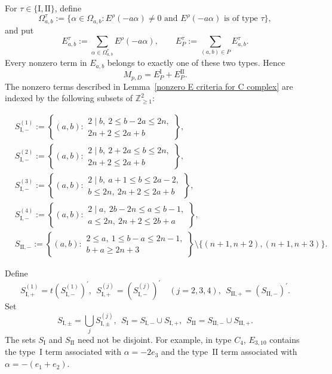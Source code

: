\documentclass[11pt,a4paper]{amsart}
\newcommand{\ZZ}{\mathbb Z}
\theoremstyle{plain}
\numberwithin{equation}{section}
\def\leq{\leqslant}
\def\geq{\geqslant}
\begin{document}
For \(\tau\in\{\mathrm{I},\mathrm{II}\}\), define
\[
\Omega_{a,b}^{\tau}
:=\{\alpha\in\Omega_{a,b}:
E^\rho(-a\alpha)\ne0
\text{ and }E^\rho(-a\alpha)\text{ is of type }\tau\},
\]
and put
\[
E_{a,b}^{\tau}
:=\sum_{\alpha\in\Omega_{a,b}^{\tau}}E^\rho(-a\alpha),
\qquad
E_P^{\tau}
:=\sum_{(a,b)\in P}E_{a,b}^{\tau}.
\]
Every nonzero term in \(E_{a,b}\) belongs to exactly one of these
two types. Hence
\begin{equation}\label{C-term-decomposition}
M_{p,D}=E_P^{\mathrm{I}}
+E_P^{\mathrm{II}}.
\end{equation}
The nonzero terms described in
Lemma~\ref{nonzero E criteria for C complex} are indexed by the following
subsets of \(\ZZ_{\geq1}^2\):
\begin{center}
\small
\(\displaystyle
\begin{aligned}
&S_{\mathrm{I},-}^{(1)}:=
\left\{(a,b):
\begin{gathered}
2\mid b,\ 2\leq b-2a\leq 2n,\\
2n+2\leq 2a+b
\end{gathered}
\right\},\\
&S_{\mathrm{I},-}^{(2)}:=
\left\{(a,b):
\begin{gathered}
2\mid b,\ 2+2a\leq b\leq 2n,\\
2n+2\leq 2a+b
\end{gathered}
\right\},\\
&S_{\mathrm{I},-}^{(3)}:=
\left\{(a,b):
\begin{gathered}
2\mid b,\ a+1\leq b\leq 2a-2,\\
b\leq 2n,\ 2n+2\leq 2a+b
\end{gathered}
\right\},\\
&S_{\mathrm{I},-}^{(4)}:=
\left\{(a,b):
\begin{gathered}
2\mid a,\ 2b-2n\leq a\leq b-1,\\
a\leq 2n,\ 2n+2\leq 2b+a
\end{gathered}
\right\},\\
&S_{\mathrm{II},-}:=
\left\{(a,b):
\begin{gathered}
2\leq a,\ 1\leq b-a\leq 2n-1,\\
b+a\geq 2n+3
\end{gathered}
\right\}
\setminus\{(n+1,n+2),(n+1,n+3)\}.
\end{aligned}
\)
\end{center}
Define
\[
S_{\mathrm{I},+}^{(1)}=t(S_{\mathrm{I},-}^{(1)})^{\prime}, \ \
S_{\mathrm{I},+}^{(j)}=(S_{\mathrm{I},-}^{(j)})^{\prime}
\quad (j=2,3,4), \ \ 
S_{\mathrm{II},+}=(S_{\mathrm{II},-})^{\prime}.
\]
Set
\[
S_{\mathrm{I},\pm}=\bigcup_j S_{\mathrm{I},\pm}^{(j)},\ \ 
S_{\mathrm{I}}=S_{\mathrm{I},-}\cup S_{\mathrm{I},+},\ \
S_{\mathrm{II}}=S_{\mathrm{II},-}\cup S_{\mathrm{II},+}.
\]
The sets \(S_{\mathrm I}\) and \(S_{\mathrm{II}}\) need not be disjoint. For example, in type \(C_4\),
\(E_{3,10}\) contains the type~\(\mathrm{I}\) term associated with
\(\alpha=-2e_3\) and the type~\(\mathrm{II}\) term associated with
\(\alpha=-(e_1+e_2)\).
\end{document}
